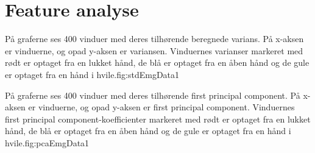 \thispagestyle{fancy}




\chapter{Feature analyse}
{På graferne ses 400 vinduer med deres tilhørende beregnede varians. På x-aksen er vinduerne, og opad y-aksen er variansen. Vinduernes varianser markeret med rødt er optaget fra en lukket hånd, de blå er optaget fra en åben hånd og de gule er optaget fra en hånd i hvile.}{fig:stdEmgData}{1}
 
{På graferne ses 400 vinduer med deres tilhørende first principal component. På x-aksen er vinduerne, og opad y-aksen er first principal component. Vinduernes first principal component-koefficienter markeret med rødt er optaget fra en lukket hånd, de blå er optaget fra en åben hånd og de gule er optaget fra en hånd i hvile.}{fig:pcaEmgData}{1}

\newpage
\listoftables
\vspace{1cm}
\listoffigures